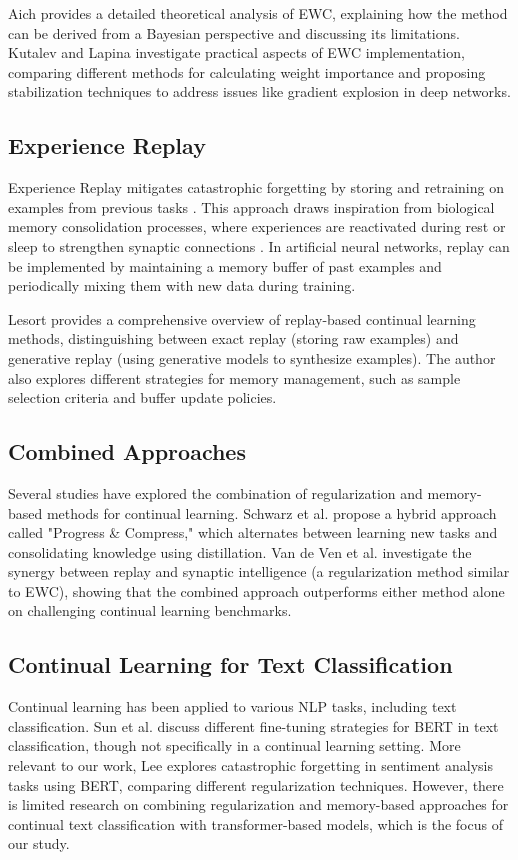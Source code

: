 \documentclass[conference]{IEEEtran}
\begin{document}
Aich \cite{b2} provides a detailed theoretical analysis of EWC, explaining how the method can be derived from a Bayesian perspective and discussing its limitations. Kutalev and Lapina \cite{b4} investigate practical aspects of EWC implementation, comparing different methods for calculating weight importance and proposing stabilization techniques to address issues like gradient explosion in deep networks.

\subsection{Experience Replay}
Experience Replay mitigates catastrophic forgetting by storing and retraining on examples from previous tasks \cite{b6}. This approach draws inspiration from biological memory consolidation processes, where experiences are reactivated during rest or sleep to strengthen synaptic connections \cite{b9}. In artificial neural networks, replay can be implemented by maintaining a memory buffer of past examples and periodically mixing them with new data during training.

Lesort \cite{b5} provides a comprehensive overview of replay-based continual learning methods, distinguishing between exact replay (storing raw examples) and generative replay (using generative models to synthesize examples). The author also explores different strategies for memory management, such as sample selection criteria and buffer update policies.

\subsection{Combined Approaches}
Several studies have explored the combination of regularization and memory-based methods for continual learning. Schwarz et al. \cite{b9} propose a hybrid approach called "Progress \& Compress," which alternates between learning new tasks and consolidating knowledge using distillation. Van de Ven et al. \cite{b9} investigate the synergy between replay and synaptic intelligence (a regularization method similar to EWC), showing that the combined approach outperforms either method alone on challenging continual learning benchmarks.

\subsection{Continual Learning for Text Classification}
Continual learning has been applied to various NLP tasks, including text classification. Sun et al. \cite{b8} discuss different fine-tuning strategies for BERT in text classification, though not specifically in a continual learning setting. More relevant to our work, Lee \cite{b9} explores catastrophic forgetting in sentiment analysis tasks using BERT, comparing different regularization techniques. However, there is limited research on combining regularization and memory-based approaches for continual text classification with transformer-based models, which is the focus of our study.
\end{document}
